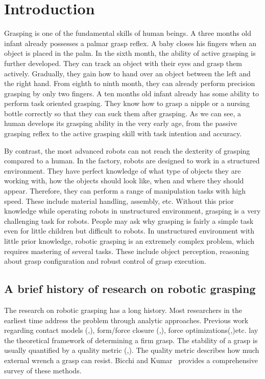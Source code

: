 
\chapter{Introduction}
Grasping is one of the fundamental skills of human beings.  A three months old infant already possesses a palmar grasp reflex. A baby closes his fingers when an object is placed in the palm. In the sixth month, the ability of active grasping is further developed. They can track an object with their eyes and grasp them actively. Gradually, they gain how to hand over an object between the left and the right hand. From eighth to ninth month, they can already perform precision grasping by only two fingers.  A ten months old infant already has some ability to perform task oriented grasping. They know how to grasp a nipple or a nursing bottle correctly so that they can suck them after grasping. As we can see, a human develops its grasping ability in the very early age, from the passive grasping reflex to the active grasping skill with task intention and accuracy. 

By contrast, the most advanced robots  can not reach the dexterity of grasping compared to a human. In the factory, robots are designed to work in a structured environment. They have perfect knowledge of what type of objects they are working with, how the objects should look like,  when and where they should appear. Therefore, they can perform a range of manipulation tasks with high speed. These include material handling, assembly, etc.  Without this prior knowledge while operating robots in unstructured environment, grasping is a very challenging task for robots. People may ask why grasping is fairly a simple task even for little children but difficult to robots. In unstructured environment with little prior knowledge, robotic grasping is an extremely complex problem, which requires mastering of several tasks. These include object perception, reasoning about grasp configuration and robust control of grasp execution. 

\section{A brief history of research on robotic grasping}
The research on robotic grasping has a long history. Most researchers in the earliest time address the problem through analytic approaches. Previous work regarding contact models (\cite{Salisbury1983},\cite{Sinha1992}),  form/force closure (\cite{Dizioglu1984},\cite{Nguyen1988}), force optimizations(\cite{Buss1996},\cite{Liu2004})etc. lay the theoretical framework of determining a firm grasp. The stability of a grasp is usually quantified by a  quality metric (\cite{roa2015grasp},\cite{Borst2004}). The quality metric describes how much external wrench a grasp can resist. Bicchi and Kumar~\cite{Bicchi2000} provides a comprehensive survey of these methods. 

